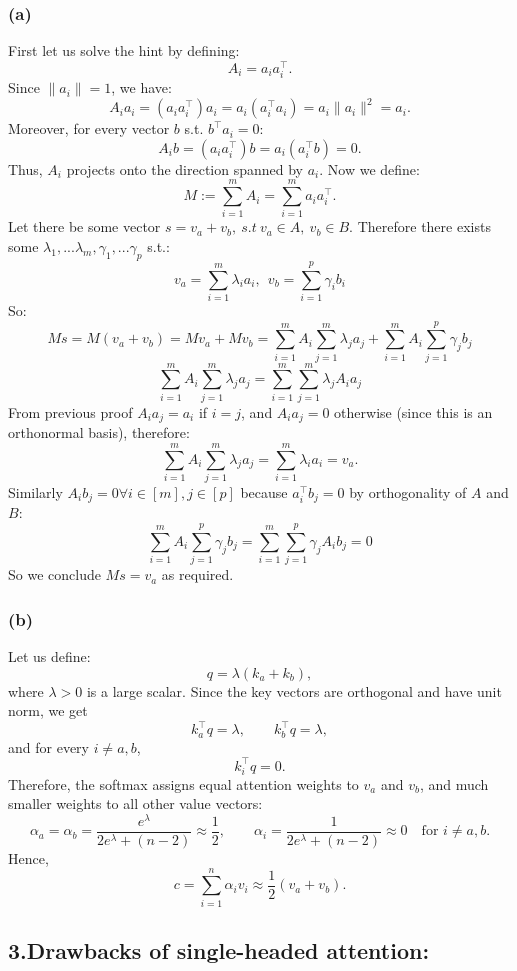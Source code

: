 \documentclass{article}
\begin{document}
\subsubsection*{(a)}
First let us solve the hint by defining:
\[
A_i = a_i a_i^\top .
\]
Since $\lVert a_i \rVert = 1$, we have:
\[
A_i a_i = (a_i a_i^\top) a_i = a_i(a_i^\top a_i)=a_i \lVert a_i \rVert^2 = a_i.
\]
Moreover, for every vector $b$ s.t. $b^\top a_i=0$:
\[
A_i b = (a_i a_i^\top) b = a_i(a_i^\top b)=0.
\]
Thus, $A_i$ projects onto the direction spanned by $a_i$.
Now we define:
\[
M:=\sum_{i=1}^mA_i=\sum_{i=1}^m a_i a_i^\top .
\]
Let there be some vector $s=v_a+v_b, \ s.t \ v_a\in A, \ v_b\in B$. Therefore there exists
some $\lambda_1,...\lambda_m, \gamma_1,...\gamma_p$ s.t.:
\[
v_a=\sum_{i=1}^m\lambda_ia_i,\ \ v_b=\sum_{i=1}^p\gamma_ib_i
\]
So:
\[
Ms=M(v_a+v_b)=Mv_a+Mv_b=\sum_{i=1}^mA_i\sum_{j=1}^m\lambda_ja_j+\sum_{i=1}^mA_i\sum_{j=1}^p\gamma_jb_j
\]
\[
\sum_{i=1}^mA_i\sum_{j=1}^m\lambda_ja_j=\sum_{i=1}^m\sum_{j=1}^m\lambda_jA_ia_j 
\]
From previous proof $A_i a_j = a_i$ if $i=j$, and $A_i a_j=0$ otherwise (since this is an orthonormal basis), therefore:
\[
\sum_{i=1}^mA_i\sum_{j=1}^m\lambda_ja_j= \sum_{i=1}^m\lambda_ia_i=v_a.
\]
Similarly $A_ib_j=0\forall i\in[m], j\in[p]$ because $a_i^\top b_j=0$ by orthogonality of $A$ and $B$:
\[
\sum_{i=1}^mA_i\sum_{j=1}^p\gamma_jb_j=\sum_{i=1}^m\sum_{j=1}^p\gamma_jA_ib_j=0
\]
So we conclude $Ms=v_a$ as required.

\subsubsection*{(b)}

Let us define:
\[
q=\lambda(k_a+k_b),
\]
where $\lambda>0$ is a large scalar. Since the key vectors are orthogonal and have unit norm, we get
\[
k_a^\top q=\lambda,\qquad k_b^\top q=\lambda,
\]
and for every $i\neq a,b$,
\[
k_i^\top q=0.
\]
Therefore, the softmax assigns equal attention weights to $v_a$ and $v_b$, and much smaller weights to all other value vectors:
\[
\alpha_a=\alpha_b=\frac{e^\lambda}{2e^\lambda+(n-2)} \approx \frac{1}{2},
\qquad
\alpha_i=\frac{1}{2e^\lambda+(n-2)}\approx 0
\quad \text{for } i\neq a,b.
\]
Hence,
\[
c=\sum_{i=1}^n \alpha_i v_i \approx \frac{1}{2}(v_a+v_b).
\]

\newpage
\subsection*{3.Drawbacks of single-headed attention:}
\end{document}
